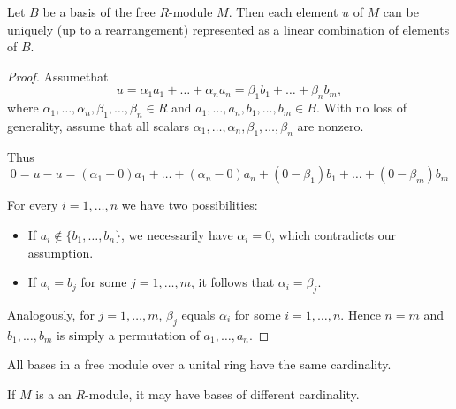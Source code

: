 \begin{proposition}\label{def:module_basis_decomposition}
  Let \( B \) be a basis of the free \( R \)-module \( M \). Then each element \( u \) of \( M \) can be uniquely (up to a rearrangement) represented as a linear combination of elements of \( B \).
\end{proposition}
\begin{proof}
  Assume\LEM that
  \begin{equation*}
    u = \alpha_1 a_1 + \ldots + \alpha_n a_n = \beta_1 b_1 + \ldots + \beta_n b_m,
  \end{equation*}
  where \( \alpha_1, \ldots, \alpha_n, \beta_1, \ldots, \beta_n \in R \) and \( a_1, \ldots, a_n, b_1, \ldots, b_m \in B \). With no loss of generality, assume that all scalars \( \alpha_1, \ldots, \alpha_n, \beta_1, \ldots, \beta_n \) are nonzero.

  Thus
  \begin{equation*}
    0 = u - u = (\alpha_1 - 0) a_1 + \ldots + (\alpha_n - 0) a_n + (0 - \beta_1) b_1 + \ldots + (0 - \beta_m) b_m
  \end{equation*}

  For every \( i = 1, \ldots, n \) we have two possibilities:
  \begin{itemize}
    \item If \( a_i \not\in \{ b_1, \ldots, b_n \} \), we necessarily have \( \alpha_i = 0 \), which contradicts our assumption.
    \item If \( a_i = b_j \) for some \( j = 1, \ldots, m \), it follows that \( \alpha_i = \beta_j \).
  \end{itemize}

  Analogously, for \( j = 1, \ldots, m \), \( \beta_j \) equals \( \alpha_i \) for some \( i = 1, \ldots, n \). Hence \( n = m \) and \( b_1, \ldots, b_m \) is simply a permutation of \( a_1, \ldots, a_n \).
\end{proof}

\begin{proposition}\label{thm:free_module_basis_cardinality}\cite{ProofWiki:bases_of_free_module_have_same_cardinality}
  All bases in a free module over a unital ring have the same cardinality.
\end{proposition}

\begin{example}\label{ex:free_module_with_non_equinumerous_bases}
  If \( M \) is a an \( R \)-module, it may have bases of different cardinality.
\end{example}

